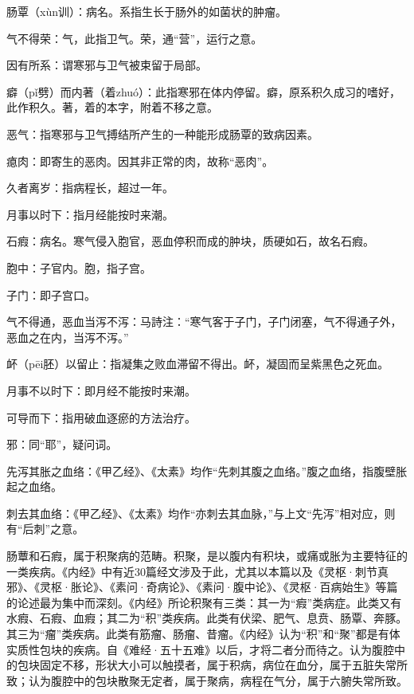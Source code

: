 \documentclass[draft,12pt]{ctexbook}
\begin{document}

\begin{jiaozhu}
	\item 肠覃（xùn训）：病名。系指生长于肠外的如菌状的肿瘤。
	\item 气不得荣：气，此指卫气。荣，通“营”，运行之意。
	\item 因有所系：谓寒邪与卫气被束留于局部。
	\item 癖（pǐ劈）而内著（着zhuó）：此指寒邪在体内停留。癖，原系积久成习的嗜好，此作积久。著，着的本字，附着不移之意。
	\item 恶气：指寒邪与卫气搏结所产生的一种能形成肠覃的致病因素。
	\item 瘜肉：即寄生的恶肉。因其非正常的肉，故称“恶肉”。
	\item 久者离岁：指病程长，超过一年。
	\item 月事以时下：指月经能按时来潮。
	\item 石瘕：病名。寒气侵入胞官，恶血停积而成的肿块，质硬如石，故名石瘕。
	\item 胞中：子官内。胞，指子宫。
	\item 子门：即子宫口。
	\item 气不得通，恶血当泻不泻：马詩注：“寒气客于子门，子门闭塞，气不得通子外，恶血之在内，当泻不泻。”
	\item 衃（pēi胚）以留止：指凝集之败血滞留不得出。衃，凝固而呈紫黑色之死血。
	\item 月事不以时下：即月经不能按时来潮。
	\item 可导而下：指用破血逐瘀的方法治疗。
	\item 邪：同“耶”，疑问词。
	\item 先泻其胀之血络：《甲乙经》、《太素》均作“先刺其腹之血络。”腹之血络，指腹壁胀起之血络。
	\item 刺去其血络：《甲乙经》、《太素》均作“亦刺去其血脉，”与上文“先泻”相对应，则有“后刺”之意。
\end{jiaozhu}


肠蕈和石瘕，属于积聚病的范畴。积聚，是以腹内有积块，或痛或胀为主要特征的一类疾病。《内经》中有近30篇经文涉及于此，尤其以本篇以及《灵枢·刺节真邪》、《灵枢·胀论》、《素问·奇病论》、《素问·腹中论》、《灵枢·百病始生》等篇的论述最为集中而深刻。《内经》所论积聚有三类：其一为“瘕”类病症。此类又有水瘕、石瘕、血瘕；其二为“积”类疾病。此类有伏梁、肥气、息贲、肠覃、奔豚。其三为“瘤”类疾病。此类有筋瘤、肠瘤、昔瘤。《内经》认为“积”和“聚”都是有体实质性包块的疾病。自《难经·五十五难》以后，才将二者分而待之。认为腹腔中的包块固定不移，形状大小可以触摸者，属于积病，病位在血分，属于五脏失常所致；认为腹腔中的包块散聚无定者，属于聚病，病程在气分，属于六腑失常所致。
\end{document}
